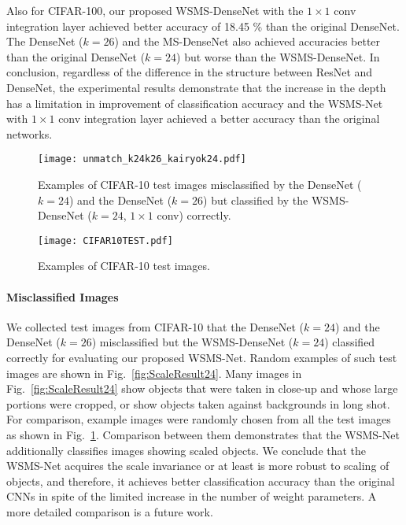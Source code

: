 \documentclass[journal]{IEEEtran}
\begin{document}
Also for CIFAR-100, our proposed WSMS-DenseNet with the $1\times1$ conv integration layer achieved better accuracy of 18.45 \% than the original DenseNet.
The DenseNet ($k=26$) and the MS-DenseNet also achieved accuracies better than the original DenseNet ($k=24$) but worse than the WSMS-DenseNet.
In conclusion, regardless of the difference in the structure between ResNet and DenseNet, the experimental results demonstrate that the increase in the depth has a limitation in improvement of classification accuracy and the WSMS-Net with $1\times1$ conv integration layer achieved a better accuracy than the original networks.


\begin{figure}[!t]
\centering
\texttt{[image: unmatch\_k24k26\_kairyok24.pdf]}
\caption{Examples of CIFAR-10 test images misclassified by the DenseNet ($k=24$) and the DenseNet ($k=26$) but classified by the WSMS-DenseNet ($k=24$, $1\times1$ conv) correctly.}
\label{fig:ScaleResult24}
\vspace*{1cm}
\centering
\texttt{[image: CIFAR10TEST.pdf]}
\caption{Examples of CIFAR-10 test images.}
\label{fig:CIFAR10TEST}
\end{figure}

\paragraph*{\textbf{Misclassified Images}}

We collected test images from CIFAR-10 that the DenseNet ($k=24$) and the DenseNet ($k=26$) misclassified but the WSMS-DenseNet ($k=24$) classified correctly for evaluating our proposed WSMS-Net.
Random examples of such test images are shown in Fig.~\ref{fig:ScaleResult24}.
Many images in Fig.~\ref{fig:ScaleResult24} show objects that were taken in close-up and whose large portions were cropped, or show objects taken against backgrounds in long shot.
For comparison, example images were randomly chosen from all the test images as shown in Fig.~\ref{fig:CIFAR10TEST}.
Comparison between them demonstrates that the WSMS-Net additionally classifies images showing scaled objects.
We conclude that the WSMS-Net acquires the scale invariance or at least is more robust to scaling of objects, and therefore, it achieves better classification accuracy than the original CNNs in spite of the limited increase in the number of weight parameters.
A more detailed comparison is a future work.
\end{document}
